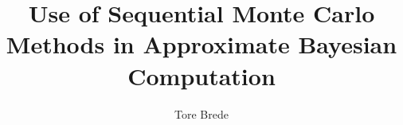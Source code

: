 \titlepage
\title{Use of Sequential Monte Carlo Methods in Approximate Bayesian Computation}
\author{Tore Brede}
\maketitle

